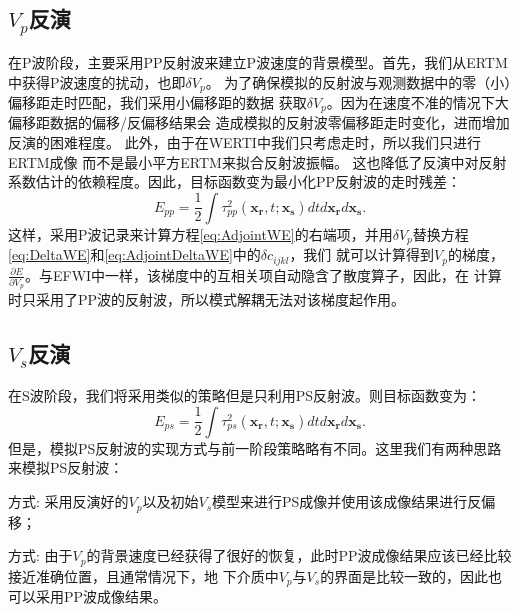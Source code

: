 \subsection{$V_p$反演}
在P波阶段，主要采用PP反射波来建立P波速度的背景模型。首先，我们从ERTM中获得P波速度的扰动，也即$\delta V_p$。
为了确保模拟的反射波与观测数据中的零（小）偏移距走时匹配，我们采用小偏移距的数据
获取$\delta V_p$。因为在速度不准的情况下大偏移距数据的偏移/反偏移结果会
造成模拟的反射波零偏移距走时变化，进而增加反演的困难程度。
此外，由于在WERTI中我们只考虑走时，所以我们只进行ERTM成像
而不是最小平方ERTM来拟合反射波振幅。
这也降低了反演中对反射系数估计的依赖程度。因此，目标函数变为最小化PP反射波的走时残差：
\begin{equation}
    E_{pp}=\frac{1}{2}\int\tau^2_{pp}(\mathbf{x_r},t;\mathbf{x_s})dtd\mathbf{x_r}d\mathbf{x_s}.
    \label{eq:ObjectivefunctionPP} 
\end{equation}
这样，采用P波记录来计算方程\eqref{eq:AdjointWE}的右端项，并用$\delta V_p$替换方程\eqref{eq:DeltaWE}和\eqref{eq:AdjointDeltaWE}中的$\delta c_{ijkl}$，我们
就可以计算得到$V_p$的梯度， $\frac{\partial E}{\partial V_p}$。与EFWI中一样，该梯度中的互相关项自动隐含了散度算子，因此，在
计算时只采用了PP波的反射波，所以模式解耦无法对该梯度起作用。

\subsection{$V_s$反演}
在S波阶段，我们将采用类似的策略但是只利用PS反射波。则目标函数变为：
\begin{equation}
    E_{ps}=\frac{1}{2}\int\tau^2_{ps}(\mathbf{x_r},t;\mathbf{x_s})dtd\mathbf{x_r}d\mathbf{x_s}.
    \label{eq:ObjectivefunctionPS} 
\end{equation}
但是，模拟PS反射波的实现方式与前一阶段策略略有不同。这里我们有两种思路来模拟PS反射波：

方式\uppercase\expandafter{}: 采用反演好的$V_p$以及初始$V_s$模型来进行PS成像并使用该成像结果进行反偏移；

方式\uppercase\expandafter{}: 由于$V_p$的背景速度已经获得了很好的恢复，此时PP波成像结果应该已经比较接近准确位置，且通常情况下，地
下介质中$V_p$与$V_s$的界面是比较一致的，因此也可以采用PP波成像结果。

